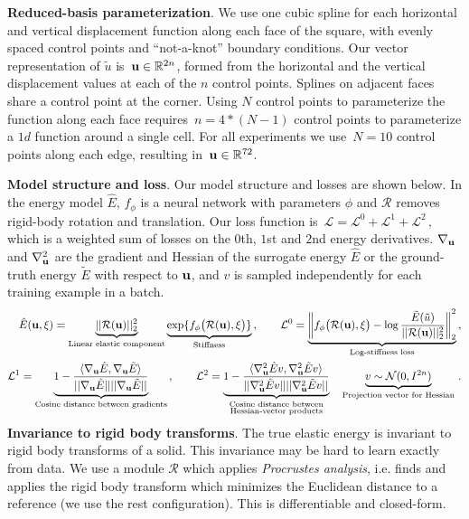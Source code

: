 \textbf{Reduced-basis parameterization}.
We use one cubic spline for each horizontal and vertical displacement function along each face of the square, with evenly spaced control points and ``not-a-knot'' boundary conditions.
Our vector representation of $\tilde{u}$ is~${{\mathbf{u}} \in \mathbb{R}^{2n}}$, formed from the horizontal and the vertical displacement values at each of the $n$ control points.
Splines on adjacent faces share a control point at the corner. Using $N$ control points to parameterize the function along each face requires~${n = 4*(N-1)}$ control points to parameterize a $1d$ function around a single cell.
For all experiments we use~${N = 10}$ control points along each edge, resulting in~${{\mathbf{u}} \in \mathbb{R}^{72}}$.

\textbf{Model structure and loss}. Our model structure and losses are shown below.
In the energy model $\hat{E}$,
$f_\phi$ is a neural network with parameters $\phi$ and $\mathcal{R}$ removes rigid-body rotation and translation.
Our loss function is~${\mathcal{L} =  \mathcal{L}^0 + \mathcal{L}^1 + \mathcal{L}^2\,,}$
which is a weighted sum of losses on the $0$th, $1$st and $2$nd energy derivatives.
$\nabla_{{\mathbf{u}}}$ and $\nabla^2_{{\mathbf{u}}}$ are the gradient and Hessian of the surrogate energy $\hat{E}$ or the ground-truth energy $\tilde{E}$ with respect to ${\mathbf{u}}$, and $v$ is sampled independently for each training example in a batch.
\small
\begin{align*}
    \hat{E}({\mathbf{u}}, \xi) = \underbrace{||\mathcal{R}({\mathbf{u}})||_2^2}_\text{Linear elastic component} \underbrace{\exp \{f_\phi \big(\mathcal{R}({\mathbf{u}}), \xi\big)\}}_\text{Stiffness}\,,\quad \quad
    \mathcal{L}^0 = \underbrace{\left\lVert f_\phi \big(\mathcal{R}({\mathbf{u}}), \xi\big) - \log \frac{\tilde{E}(\tilde{u})}{||\mathcal{R}({\mathbf{u}})||_2^2} \right\rVert_2^2}_\text{Log-stiffness loss}\,, \\
    \mathcal{L}^1 = \underbrace{1 - \frac{\langle \nabla_{{\mathbf{u}}} \hat{E}, \nabla_{{\mathbf{u}}} \tilde{E}\rangle}{||\nabla_{{\mathbf{u}}} \hat{E}|| ||\nabla_{{\mathbf{u}}} \tilde{E}||}}_\text{Cosine distance between gradients}\,,\quad \quad
    \mathcal{L}^2 = \underbrace{1 - \frac{\langle \nabla^2_{{\mathbf{u}}} \hat{E} v,  \nabla^2_{{\mathbf{u}}} \tilde{E} v \rangle}{||\nabla^2_{{\mathbf{u}}} \hat{E} v|| ||\nabla^2_{{\mathbf{u}}} \tilde{E} v||}}_{\substack{\text{Cosine distance between}\\\text{Hessian-vector products}}} \quad \underbrace{v \sim \mathcal{N}(0, I^{2n})}_\text{Projection vector for Hessian}\,.
\end{align*}\normalsize
\textbf{Invariance to rigid body transforms}.
The true elastic energy is invariant to rigid body transforms of a solid.
This invariance may be hard to learn exactly from data. We use a module $\mathcal{R}$ which applies \emph{Procrustes analysis}, i.e. finds and applies the rigid body transform which minimizes the Euclidean distance to a reference (we use the rest configuration). This is differentiable and closed-form.

